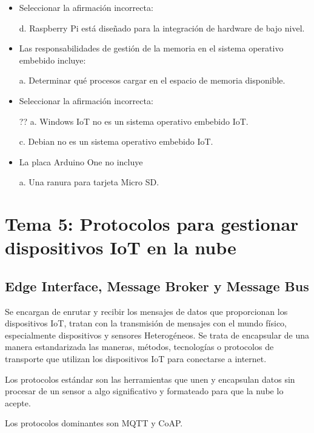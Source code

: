 \documentclass[12pt]{report} %
\begin{document}
\begin{itemize}
	\item Seleccionar la afirmación incorrecta:
	
	d. Raspberry Pi está diseñado para la integración de hardware de bajo nivel.
	
	\item Las responsabilidades de gestión de la memoria en el sistema operativo embebido incluye:
	
	a. Determinar qué procesos cargar en el espacio de memoria disponible.
	
	\item Seleccionar la afirmación incorrecta:
	
	?? a. Windows IoT no es un sistema operativo embebido IoT.
	
	c. Debian no es un sistema operativo embebido IoT. 
	
	\item La placa Arduino One no incluye
	
	a. Una ranura para tarjeta Micro SD.
\end{itemize}


\chapter{Tema 5: Protocolos para gestionar dispositivos IoT en la nube}

\section{Edge Interface, Message Broker y Message Bus}

Se encargan de enrutar y recibir los mensajes de datos que proporcionan los dispositivos IoT, tratan con la transmisión de mensajes con el mundo físico, especialmente dispositivos y sensores Heterogéneos. Se trata de encapsular de una manera estandarizada las maneras, métodos, tecnologías o protocolos de transporte que utilizan los dispositivos IoT para conectarse a internet.

Los protocolos estándar son las herramientas que unen y encapsulan datos sin procesar de un sensor a algo significativo y formateado para que la nube lo acepte.

Los protocolos dominantes son MQTT y CoAP.
\end{document}
